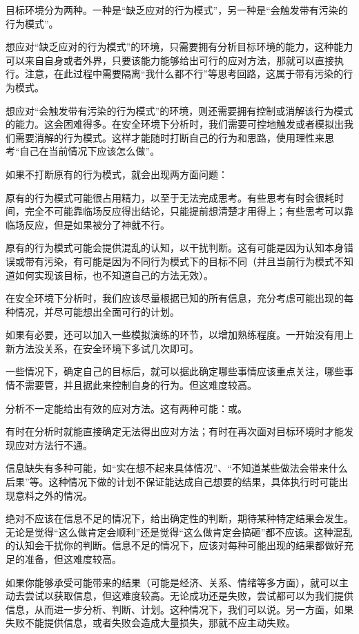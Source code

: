 目标环境分为两种。一种是“缺乏应对的行为模式”，另一种是“会触发带有污染的行为模式”。
\begin{explain}
想应对“缺乏应对的行为模式”的环境，只需要拥有分析目标环境的能力，这种能力可以来自自身或者外界，只要该能力能够给出可行的应对方法，那就可以直接执行。注意，在此过程中需要隔离“我什么都不行”等思考回路，这属于带有污染的行为模式。
\end{explain}
想应对“会触发带有污染的行为模式”的环境，则还需要拥有控制或消解该行为模式的能力。这会困难得多。在安全环境下分析时，我们需要可控地触发或者模拟出我们需要消解的行为模式。这样才能随时打断自己的行为和思路，使用理性来思考“自己在当前情况下应该怎么做”。
\begin{explain}
如果不打断原有的行为模式，就会出现两方面问题：

原有的行为模式可能很占用精力，以至于无法完成思考。有些思考有时会很耗时间，完全不可能靠临场反应得出结论，只能提前想清楚才用得上；有些思考可以靠临场反应，但是如果被分了神就不行。

原有的行为模式可能会提供混乱的认知，以干扰判断。这有可能是因为认知本身错误或带有污染，有可能是因为不同行为模式下的目标不同（并且当前行为模式不知道如何实现该目标，也不知道自己的方法无效）。
\end{explain}
在安全环境下分析时，我们应该尽量根据已知的所有信息，充分考虑可能出现的每种情况，并尽可能想出全面可行的计划。
\begin{explain}
如果有必要，还可以加入一些模拟演练的环节，以增加熟练程度。一开始没有用上新方法没关系，在安全环境下多试几次即可。

一些情况下，确定自己的目标后，就可以据此确定哪些事情应该重点关注，哪些事情不需要管，并且据此来控制自身的行为。但这难度较高。
\end{explain}
分析不一定能给出有效的应对方法。这有两种可能：或。
\begin{explain}
有时在分析时就能直接确定无法得出应对方法；有时在再次面对目标环境时才能发现应对方法行不通。

信息缺失有多种可能，如“实在想不起来具体情况”、“不知道某些做法会带来什么后果”等。这种情况下做的计划不保证能达成自己想要的结果，具体执行时可能出现意料之外的情况。

绝对不应该在信息不足的情况下，给出确定性的判断，期待某种特定结果会发生。无论是觉得“这么做肯定会顺利”还是觉得“这么做肯定会搞砸”都不应该。这种混乱的认知会干扰你的判断。信息不足的情况下，应该对每种可能出现的结果都做好充足的准备，但这难度较高。

如果你能够承受可能带来的结果（可能是经济、关系、情绪等多方面），就可以主动去尝试以获取信息，但这难度较高。无论成功还是失败，尝试都可以为我们提供信息，从而进一步分析、判断、计划。这种情况下，我们可以说。另一方面，如果失败不能提供信息，或者失败会造成大量损失，那就不应主动失败。
\end{explain}

